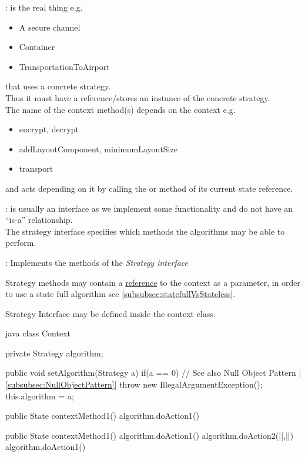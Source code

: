 \begin{partbox}[Participants]\nospacing
  \begin{itemizenosep}
      \item {}: 
      is the real thing e.g.\
      \begin{itemize}
          \item A secure channel
          \item Container
          \item TransportationToAirport
      \end{itemize}
      that uses a concrete strategy.\\
      Thus it must have a reference/stores an instance of the concrete strategy.\\
      The name of the context method(s) depends on the context e.g.\
      \begin{itemize}
          \item encrypt, decrypt
          \item addLayoutComponent, minimumLayoutSize
          \item transport
      \end{itemize}
      and acts depending on it by calling the  or  method of its current state reference.
      \item {}: is
        usually an interface as we implement some functionality and do not have an
        ``is-a'' relationship.\\
        The strategy interface specifies which methods the algorithms may be
        able to perform.
    \item \imp{Concrete Algorithm}: Implements the methods of the \textit{Strategy interface}
  \end{itemizenosep}
\end{partbox}
\begin{notebox}[Note]\nospacing
  \begin{itemizenosep}
    \item Strategy methods may contain a \ul{reference} to the context as a parameter,
  in order to use a state full algorithm see
  \cref{subsubsec:statefullVsStateless}.
    \item Strategy Interface may be defined inside the context class.
  \end{itemizenosep}
\end{notebox}
\begin{codeboxNl}[Context]{java}
  class Context{
    private Strategy algorithm;
    
    public void setAlgorithm(Strategy a){
      if(a == 0){ // See also Null Object Pattern |\cref{subsubsec:NullObjectPattern}|
        throw new IllegalArgumentException();
      } 
      this.algorithm = a;
    }

    public State contextMethod1(){
      algorithm.doAction1()
    }

    public State contextMethod1(){
      algorithm.doAction1()
      algorithm.doAction2(|\ul{}|,||)
      algorithm.doAction1()
    }

  }
\end{codeboxNl}
